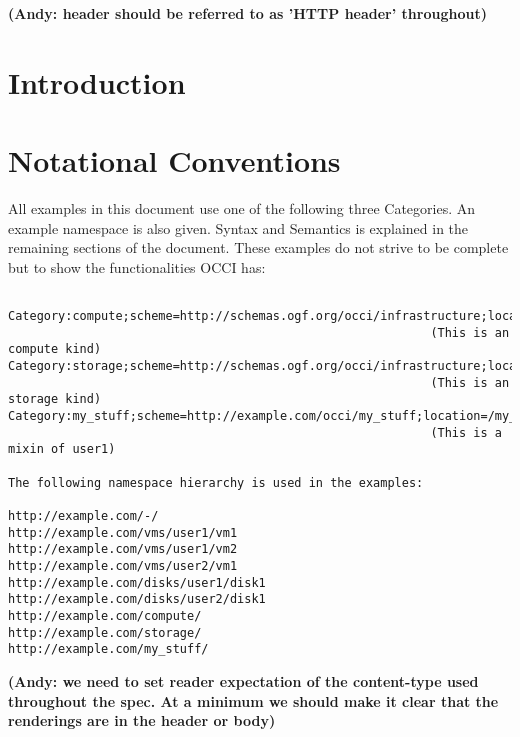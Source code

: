 \documentclass[10pt,a4paper]{article}
\begin{document}
\textbf{(Andy: header should be referred to as 'HTTP header' throughout)}

\newpage
\tableofcontents
\newpage

\section{Introduction}


\section{Notational Conventions}


All examples in this document use one of the following three
Categories. An example namespace is also given. Syntax and Semantics
is explained in the remaining sections of the document. These examples
do not strive to be complete but to show the functionalities OCCI has:

\begin{verbatim}

Category:compute;scheme=http://schemas.ogf.org/occi/infrastructure;location=/compute 
                                                           (This is an compute kind)
Category:storage;scheme=http://schemas.ogf.org/occi/infrastructure;location=/storage 
                                                           (This is an storage kind)
Category:my_stuff;scheme=http://example.com/occi/my_stuff;location=/my_stuff 
                                                           (This is a mixin of user1)

The following namespace hierarchy is used in the examples:

http://example.com/-/
http://example.com/vms/user1/vm1
http://example.com/vms/user1/vm2
http://example.com/vms/user2/vm1
http://example.com/disks/user1/disk1
http://example.com/disks/user2/disk1
http://example.com/compute/
http://example.com/storage/
http://example.com/my_stuff/
\end{verbatim}

\textbf{(Andy: we need to set reader expectation of the content-type used 
throughout the spec. At a minimum we should make it clear that the 
renderings are in the header or body)}
\end{document}
